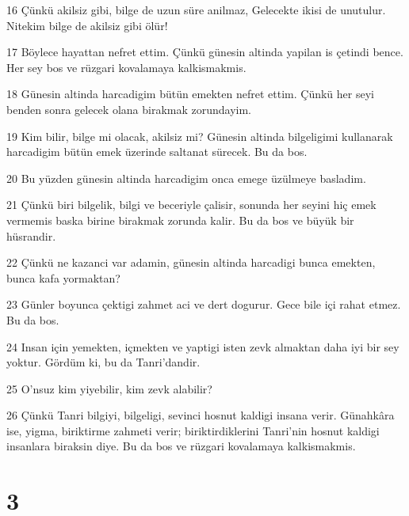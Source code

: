\par 16 Çünkü akilsiz gibi, bilge de uzun süre anilmaz, Gelecekte ikisi de unutulur. Nitekim bilge de akilsiz gibi ölür!
\par 17 Böylece hayattan nefret ettim. Çünkü günesin altinda yapilan is çetindi bence. Her sey bos ve rüzgari kovalamaya kalkismakmis.
\par 18 Günesin altinda harcadigim bütün emekten nefret ettim. Çünkü her seyi benden sonra gelecek olana birakmak zorundayim.
\par 19 Kim bilir, bilge mi olacak, akilsiz mi? Günesin altinda bilgeligimi kullanarak harcadigim bütün emek üzerinde saltanat sürecek. Bu da bos.
\par 20 Bu yüzden günesin altinda harcadigim onca emege üzülmeye basladim.
\par 21 Çünkü biri bilgelik, bilgi ve beceriyle çalisir, sonunda her seyini hiç emek vermemis baska birine birakmak zorunda kalir. Bu da bos ve büyük bir hüsrandir.
\par 22 Çünkü ne kazanci var adamin, günesin altinda harcadigi bunca emekten, bunca kafa yormaktan?
\par 23 Günler boyunca çektigi zahmet aci ve dert dogurur. Gece bile içi rahat etmez. Bu da bos.
\par 24 Insan için yemekten, içmekten ve yaptigi isten zevk almaktan daha iyi bir sey yoktur. Gördüm ki, bu da Tanri'dandir.
\par 25 O'nsuz kim yiyebilir, kim zevk alabilir?
\par 26 Çünkü Tanri bilgiyi, bilgeligi, sevinci hosnut kaldigi insana verir. Günahkâra ise, yigma, biriktirme zahmeti verir; biriktirdiklerini Tanri'nin hosnut kaldigi insanlara biraksin diye. Bu da bos ve rüzgari kovalamaya kalkismakmis.

\chapter{3}

